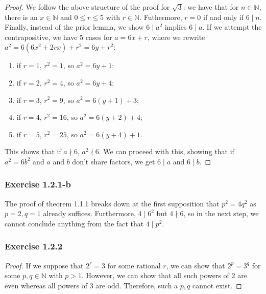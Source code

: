 \documentclass{article}
\newcommand{\N}{\mathbb{N}}
\begin{document}
\begin{proof}
We follow the above structure of the proof for $\sqrt{3}$: we have that for $n \in \N$,
there is an $x \in \N$ and $0 \leq r \leq 5$ with $r \in \N$. Futhermore, $r = 0$ if and only if $6 \mid n$.
Finally, instead of the prior lemma, we show $6 \mid a^2$ implies $6 \mid a$.
If we attempt the contrapositive, we have 5 cases for $a = 6x + r$, where we rewrite $a^2 = 6 (6x^2 + 2rx) + r^2 = 6y + r^2$:
\begin{enumerate}
    \item if $r = 1$, $r^2 = 1$, so $a^2 = 6y + 1$;
    \item if $r = 2$, $r^2 = 4$, so $a^2 = 6y + 4$;
    \item if $r = 3$, $r^2 = 9$, so $a^2 = 6(y + 1) + 3$;
    \item if $r = 4$, $r^2 = 16$, so $a^2 = 6(y + 2) + 4$;
    \item if $r = 5$, $r^2 = 25$, so $a^2 = 6(y + 4) + 1$.
\end{enumerate}
This shows that if $a \nmid 6$, $a^2 \nmid 6$. We can proceed with this, showing that if $a^2 = 6b^2$ and
$a$ and $b$ don't share factors, we get $6 \mid a$ and $6 \mid b$.
\end{proof}

\subsubsection*{Exercise 1.2.1-b}

The proof of theorem 1.1.1 breaks down at the first supposition that $p^2 = 4q^2$ as $p = 2, q = 1$ already suffices.
Furthermore, $4 \mid 6^2$ but $4 \nmid 6$, so in the next step, we cannot conclude anything from the fact that $4 \mid p^2$.

\subsubsection*{Exercise 1.2.2}

\begin{proof}
If we suppose that $2^r = 3$ for some rational $r$, we can show that $2^p = 3^q$ for some $p, q \in \N$ with $p > 1$.
However, we can show that all such powers of 2 are even whereas all powers of 3 are odd. Therefore, such a $p, q$
cannot exist.
\end{proof}
\end{document}
